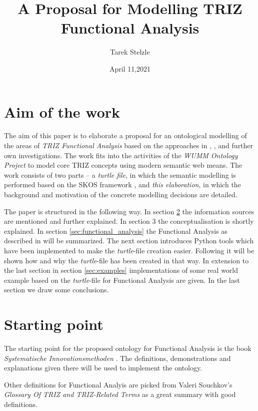 \documentclass[11pt,a4paper]{article}
\title{A Proposal for Modelling TRIZ Functional Analysis}
\author{Tarek Stelzle}
\date{April 11,2021}
\begin{document}
\maketitle

\tableofcontents

\section{Aim of the work}

The aim of this paper is to elaborate a proposal for an ontological modelling
of the areas of \emph{TRIZ Functional Analysis} based on the approaches in
\cite{KS}, \cite{WebinarFunctionAnalysis}, \cite{SouchkovGlossary} and further
own investigations.  The work fits into the activities of the \emph{WUMM
  Ontology Project} \cite{WUMM} to model core TRIZ concepts using modern
semantic web means.  The work consists of two parts -- a \emph{turtle file},
in which the semantic modelling is performed based on the SKOS framework
\cite{SKOS}, and \emph{this elaboration}, in which the background and
motivation of the concrete modelling decisions are detailed.

The paper is structured in the following way.  In section
\ref{sec:starting_point} the information sources are mentioned and further
explained.  In section 3 the conceptualisation is shortly explained.  In
section \ref{sec:functional_analysis} the Functional Analysis as described in
\cite{KS} will be summarized.  The next section introduces Python tools which
have been implemented to make the \textit{turtle}-file creation easier.
Following it will be shown how and why the \textit{turtle}-file has been
created in that way.  In extension to the last section in section
\ref{sec:examples} implementations of some real world example based on the
\textit{turtle}-file for Functional Analysis are given.  In the last section
we draw some conclusions.

\section{Starting point} 
\label{sec:starting_point}

The starting point for the proposed ontology for Functional Analysis is the
book \textit{Systematische Innovationsmethoden} \cite{KS}.  The definitions,
demonstrations and explanations given there will be used to implement the
ontology.

Other definitions for Functional Analyis are picked from Valeri Souchkov's
\textit{Glossary Of TRIZ and TRIZ-Related Terms} \cite{SouchkovGlossary} as a
great summary with good definitions.
\end{document}
